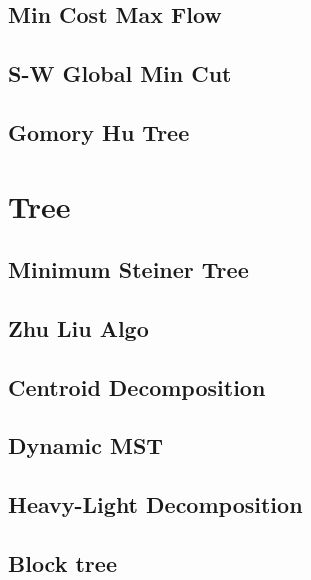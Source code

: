 \documentclass[a4paper,10pt,twocolumn,oneside]{article}
\begin{document}
\subsection{Min Cost Max Flow}


\subsection{S-W Global Min Cut}


\subsection{Gomory Hu Tree}


\section{Tree}

\subsection{Minimum Steiner Tree}


\subsection{Zhu Liu Algo}


\subsection{Centroid Decomposition}


\subsection{Dynamic MST}


\subsection{Heavy-Light Decomposition}


\subsection{Block tree}

\end{document}
